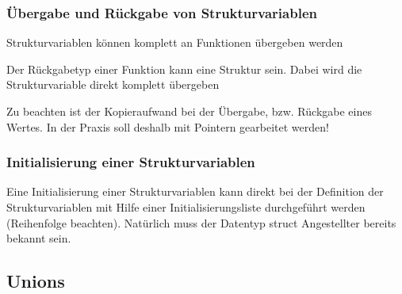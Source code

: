 		\subsubsection{Übergabe und Rückgabe von Strukturvariablen}
			\begin{compactitem}
				\item Strukturvariablen können komplett an Funktionen übergeben werden
				\item Der Rückgabetyp einer Funktion kann eine Struktur sein. Dabei wird die Strukturvariable direkt komplett übergeben
				\item Zu beachten ist der Kopieraufwand bei der Übergabe, bzw. Rückgabe eines Wertes. In der Praxis soll deshalb mit Pointern gearbeitet werden!
				 
			\end{compactitem}
		\newpage
		\subsubsection{Initialisierung einer Strukturvariablen}
			Eine Initialisierung einer Strukturvariablen kann direkt bei der Definition der Strukturvariablen mit Hilfe einer Initialisierungsliste durchgeführt werden (Reihenfolge beachten). Natürlich muss der Datentyp struct Angestellter bereits bekannt sein. 
			 				
	\subsection{Unions}
